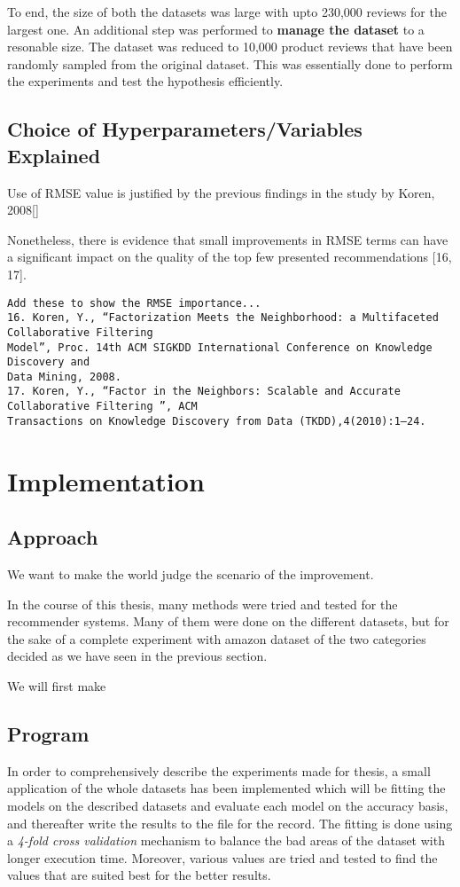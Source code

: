 To end, the size of both the datasets was large with upto 230,000 reviews for the largest one. An additional step was performed to \textbf{manage the dataset} to a resonable size. The dataset was reduced to 10,000 product reviews that have been randomly sampled from the original dataset. This was essentially done to perform the experiments and test the hypothesis efficiently.


\subsection{Choice of Hyperparameters/Variables Explained}

Use of RMSE value is justified by the previous findings in the study by Koren, 2008[\ci]


Nonetheless, there is evidence that small improvements in RMSE terms can have a significant impact on the quality of the top few presented recommendations [16, 17].

\begin{verbatim}
Add these to show the RMSE importance...
16. Koren, Y., “Factorization Meets the Neighborhood: a Multifaceted Collaborative Filtering
Model”, Proc. 14th ACM SIGKDD International Conference on Knowledge Discovery and
Data Mining, 2008.
17. Koren, Y., “Factor in the Neighbors: Scalable and Accurate Collaborative Filtering ”, ACM
Transactions on Knowledge Discovery from Data (TKDD),4(2010):1–24.
\end{verbatim}





\section{Implementation}
\subsection{Approach}
We want to make the world judge the scenario of the improvement.

In the course of this thesis, many methods were tried and tested for the recommender systems. Many of them were done on the different datasets, but for the sake of a complete experiment with amazon dataset of the two categories decided as we have seen in the previous section. 

We will first make 


\subsection{Program}
In order to comprehensively describe the experiments made for thesis, a small application of the whole datasets has been implemented which will be fitting the models on the described datasets and evaluate each model on the accuracy basis, and thereafter write the results to the file for the record. The fitting is done using a \textit{4-fold cross validation} mechanism to balance the bad areas of the dataset with longer execution time. Moreover, various values are tried and tested to find the values that are suited best for the better results.

